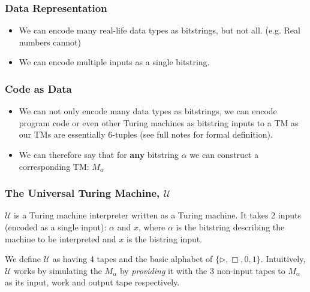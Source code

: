 \message{ !name(AlgComplexAllFlashCards.tex)}\documentclass{beamer}
\newcommand{\U}{\mathcal{U}}
\begin{document}
\begin{frame}
  \frametitle{Data Representation}
  \begin{itemize}
    \item We can encode many real-life data types as bitstrings, but not all. (e.g. Real numbers cannot)
    \item We can encode multiple inputs as a single bitstring.
  \end{itemize}
\end{frame}

\begin{frame}
  \frametitle{Code as Data}
  \begin{itemize}
    \item We can not only encode many data types as bitstrings, we can encode program code or even other Turing machines as bitstring inputs to a TM as our TMs are essentially 6-tuples (see full notes for formal definition).
    \item We can therefore say that for \textbf{any} bitstring \(\alpha\) we can construct a corresponding TM:  $M_{\alpha}$
  \end{itemize}
\end{frame}

\begin{frame}
  \frametitle{The Universal Turing Machine, $\U$}

  $\U$ is a Turing machine interpreter written as a Turing machine. It takes 2 inputs (encoded as a single input): $\alpha$ and $x$, where $\alpha$ is the bitstring describing the machine to be interpreted and $x$ is the bistring input.

  We define $\U$ as having 4 tapes and the basic alphabet of $\{ \rhd, \Box, 0,1 \} $.  Intuitively, $\U$ works by simulating the $M_{\alpha}$ by \textit{providing} it with the 3 non-input tapes to $M_{\alpha}$ as its input, work and output tape respectively.
\end{frame}
\end{document}
